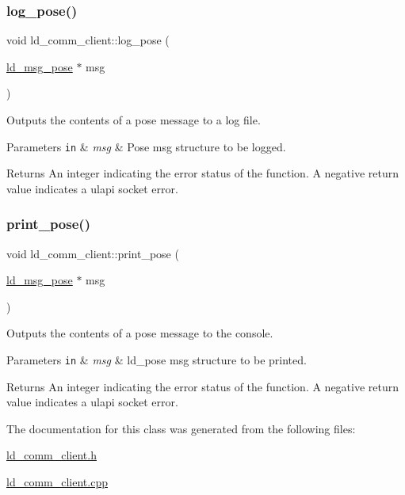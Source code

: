 \subsubsection{\texorpdfstring{log\+\_\+pose()}{log\_pose()}}
{\footnotesize\ttfamily void ld\+\_\+comm\+\_\+client\+::log\+\_\+pose (\begin{DoxyParamCaption}\item[{\hyperlink{structld__msg__pose}{ld\+\_\+msg\+\_\+pose} $\ast$}]{msg }\end{DoxyParamCaption})}

Outputs the contents of a pose message to a log file. 
\begin{DoxyParams}[1]{Parameters}
\mbox{\tt in}  & {\em msg} & Pose msg structure to be logged. \\
\hline
\end{DoxyParams}
\begin{DoxyReturn}{Returns}
An integer indicating the error status of the function. A negative return value indicates a ulapi socket error. 
\end{DoxyReturn}
\mbox{\label{classld__comm__client_a29a4395433e6f9d9ec7c3589de7ae211}} 
\subsubsection{\texorpdfstring{print\+\_\+pose()}{print\_pose()}}
{\footnotesize\ttfamily void ld\+\_\+comm\+\_\+client\+::print\+\_\+pose (\begin{DoxyParamCaption}\item[{\hyperlink{structld__msg__pose}{ld\+\_\+msg\+\_\+pose} $\ast$}]{msg }\end{DoxyParamCaption})}

Outputs the contents of a pose message to the console. 
\begin{DoxyParams}[1]{Parameters}
\mbox{\tt in}  & {\em msg} & ld\+\_\+pose msg structure to be printed. \\
\hline
\end{DoxyParams}
\begin{DoxyReturn}{Returns}
An integer indicating the error status of the function. A negative return value indicates a ulapi socket error. 
\end{DoxyReturn}


The documentation for this class was generated from the following files\+:\begin{DoxyCompactItemize}
\item 
\hyperlink{ld__comm__client_8h}{ld\+\_\+comm\+\_\+client.\+h}\item 
\hyperlink{ld__comm__client_8cpp}{ld\+\_\+comm\+\_\+client.\+cpp}\end{DoxyCompactItemize}
